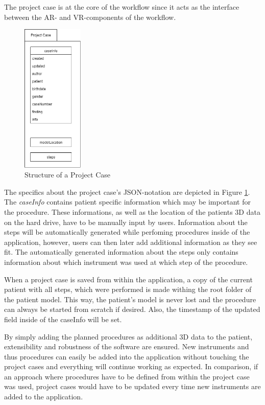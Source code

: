 The project case is at the core of the workflow since it acts as the interface between the AR- and VR-components of the workflow.

\begin{figure}[ht]
    \centering
    \includegraphics[width=110px]{images/implementation/project_case.png}
    \caption{\label{fig::ImplementationProjectCase}Structure of a Project Case}
\end{figure}

The specifics about the project case's JSON-notation are depicted in Figure \ref{fig::ImplementationProjectCase}.
The \emph{caseInfo} contains patient specific information which may be important for the procedure.
These informations, as well as the location of the patients 3D data on the hard drive, have to be manually input by users.
Information about the steps will be automatically generated while perfoming procedures inside of the application, however, users can then later add additional information as they see fit.
The automatically generated information about the steps only contains information about which instrument was used at which step of the procedure.

When a project case is saved from within the application, a copy of the current patient with all steps, which were performed is made withing the root folder of the patient model.
This way, the patient's model is never lost and the procedure can always be started from scratch if desired.
Also, the timestamp of the updated field inside of the caseInfo will be set.

By simply adding the planned procedures as additional 3D data to the patient, extensibility and robustness of the software are ensured.
New instruments and thus procedures can easily be added into the application without touching the project cases and everything will continue working as expected.
In comparison, if an approach where procedures have to be defined from within the project case was used, project cases would have to be updated every time new 
instruments are added to the application.